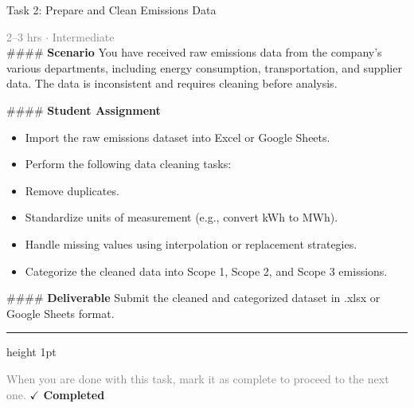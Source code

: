 \documentclass[10pt,a4paper]{article}
\begin{document}
\begin{taskbox}{Task 2: Prepare and Clean Emissions Data}

    {\small \textcolor{gray}{2--3 hrs $\cdot$ Intermediate}}\\[12pt]

    \#\#\#\# \textbf{Scenario}  
You have received raw emissions data from the company’s various departments, including energy consumption, transportation, and supplier data. The data is inconsistent and requires cleaning before analysis.

\#\#\#\# \textbf{Student Assignment}
\begin{itemize}
    \item Import the raw emissions dataset into Excel or Google Sheets.  
    \item Perform the following data cleaning tasks:  
    \item Remove duplicates.  
    \item Standardize units of measurement (e.g., convert kWh to MWh).  
    \item Handle missing values using interpolation or replacement strategies.  
    \item Categorize the cleaned data into Scope 1, Scope 2, and Scope 3 emissions.
\end{itemize}

\#\#\#\# \textbf{Deliverable}
Submit the cleaned and categorized dataset in .xlsx or Google Sheets format.\par

    \vspace{16pt}

    \textcolor{cardBorder}{\hrule height 1pt}\vspace{8pt}

    \small \textcolor{gray}{When you are done with this task, mark it as complete to proceed to the next one.} \hfill \textbf{\textcolor{brandDark}{$\checkmark$ Completed}}

\end{taskbox}
\end{document}
